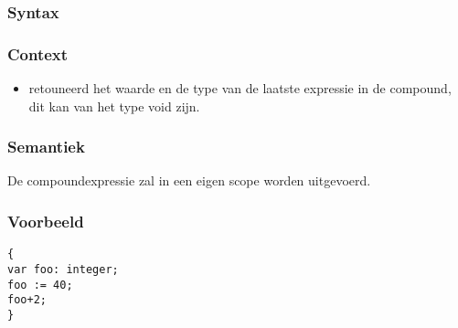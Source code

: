 \documentclass[]{article}
\begin{document}
\subsubsection{Syntax}

\subsubsection{Context}
\begin{itemize}
\item retouneerd het waarde en de type van de laatste expressie in de compound, dit kan van het type void zijn.
\end{itemize}
\subsubsection{Semantiek}
De compoundexpressie zal in een eigen scope worden uitgevoerd.
\subsubsection{Voorbeeld}
\begin{lstlisting}[style=SELMA]
{
var foo: integer;
foo := 40;
foo+2;
}
\end{lstlisting}



%
%



%
%
%
\end{document}
